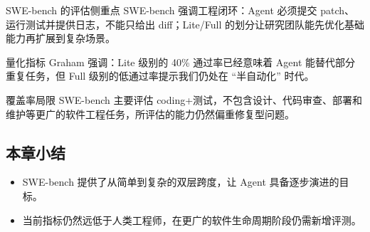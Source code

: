 \begin{knowledgebox}{SWE-bench 的评估侧重点}
SWE-bench 强调工程闭环：Agent 必须提交 patch、运行测试并提供日志，不能只给出 diff；Lite/Full 的划分让研究团队能先优化基础能力再扩展到复杂场景。
\end{knowledgebox}

\begin{importantbox}{量化指标}
Graham 强调：Lite 级别的 40\% 通过率已经意味着 Agent 能替代部分重复任务，但 Full 级别的低通过率提示我们仍处在 “半自动化” 时代。
\end{importantbox}

\begin{warningbox}{覆盖率局限}
SWE-bench 主要评估 coding+测试，不包含设计、代码审查、部署和维护等更广的软件工程任务，所评估的能力仍然偏重修复型问题。
\end{warningbox}

\subsection{本章小结}
\begin{itemize}
    \item SWE-bench 提供了从简单到复杂的双层跨度，让 Agent 具备逐步演进的目标。
    \item 当前指标仍然远低于人类工程师，在更广的软件生命周期阶段仍需新增评测。
\end{itemize}


